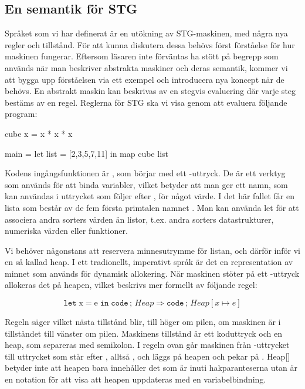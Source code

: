\documentclass[../Core]{subfiles}
\begin{document}
\subsection{En semantik för STG}





Språket som vi har definerat är en utökning av STG-maskinen, med några
nya regler och tillstånd. För att kunna diskutera dessa behövs först
förståelse för hur maskinen fungerar. Eftersom läsaren inte förväntas
ha stött på begrepp som används när man beskriver abstrakta maskiner
och deras semantik, kommer vi att bygga upp förståelsen via ett exempel
och introducera nya koncept när de behövs. En abstrakt maskin kan beskrivas
av en stegvis evaluering där varje steg bestäms av en regel. Reglerna
för STG ska vi visa genom att evaluera följande program:

\begin{codeEx}
cube x = x * x * x

main = let list = [2,3,5,7,11]
        in map cube list
\end{codeEx}

Kodens ingångsfunktionen är , som börjar med ett -uttryck.
De är ett verktyg som används för att binda variabler, vilket betyder att man ger ett
namn, som kan användas i uttrycket som följer efter ,
för något värde. I det här fallet får
en lista som består av de fem första primtalen namnet .
Man kan använda let för att associera andra sorters värden än listor,
t.ex. andra sorters datastrukturer, numeriska värden eller funktioner.

Vi behöver någonstans att reservera minnesutrymme för listan, och därför
inför vi en så kallad heap. I ett tradionellt, imperativt språk är
det en representation av minnet som används för dynamisk allokering. När
maskinen stöter på ett -uttryck allokeras det på heapen, vilket
beskrivs mer formellt av följande regel:

\[
\mathtt{let\;\mathrm{x\mathtt{=}e}\; in\; code}\,;\, Heap\Rightarrow\mathtt{code}\,;\, Heap[x\mapsto e]\]


Regeln säger vilket nästa tillstånd blir, till höger om pilen,
om maskinen är i tillståndet till vänster om pilen.
Maskinens tillstånd är ett koduttryck och en heap, som separeras med
semikolon. I regeln ovan går maskinen från -uttrycket till
uttrycket som står efter , alltså ,
och  läggs på heapen och pekar på .
Heap{[}{]} betyder inte att heapen bara innehåller det som är inuti
hakparanteserna utan är en notation för att visa att heapen
uppdateras med en variabelbindning.
\end{document}
